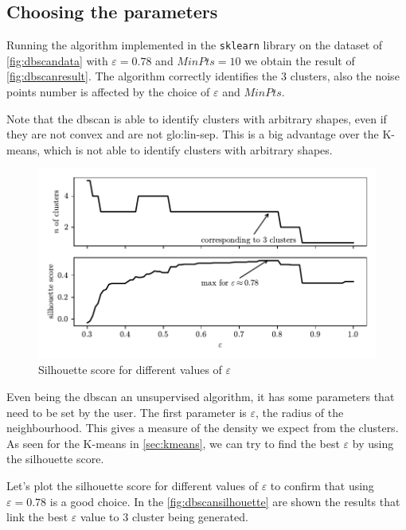 \subsection{Choosing the parameters}
Running the algorithm implemented in the \texttt{sklearn} library on the dataset of \autoref{fig:dbscandata} with $\varepsilon = 0.78$ and $MinPts = 10$ we obtain the result of \autoref{fig:dbscanresult}. The algorithm correctly identifies the $3$ clusters, also the noise points number is affected by the choice of $\varepsilon$ and $MinPts$.

Note that the \gls{dbscan} is able to identify clusters with arbitrary shapes, even if they are not convex and are not \gls{glo:lin-sep}. This is a big advantage over the K-means, which is not able to identify clusters with arbitrary shapes.


\begin{figure}
    \centering
    \includegraphics{images/DBSCAN/Figure_4.pdf}
    \caption{Silhouette score for different values of $\varepsilon$}
    \label{fig:dbscansilhouette}
\end{figure}

Even being the \gls{dbscan} an unsupervised algorithm, it has some parameters that need to be set by the user.
The first parameter is $\varepsilon$, the radius of the neighbourhood. This gives a measure of the density we expect from the clusters. As seen for the K-means in \autoref{sec:kmeans}, we can try to find the best $\varepsilon$ by using the silhouette score.

Let's plot the silhouette score for different values of $\varepsilon$ to confirm that using $\varepsilon = 0.78$ is a good choice. In the \autoref{fig:dbscansilhouette} are shown the results that link the best $\varepsilon$ value to $3$ cluster being generated.

